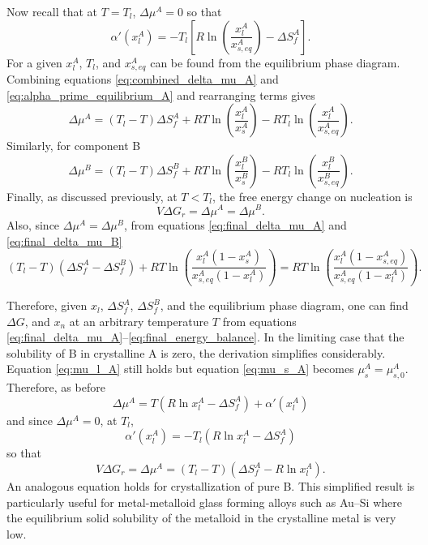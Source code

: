 Now recall that at \(T = T_l\), \(\Delta \mu^A = 0\) so that
\begin{equation}
\alpha'(x_l^A) = -T_l \left[ R \ln\left(\frac{x_l^A}{x_{s,eq}^A}\right) - \Delta S_f^A \right]. \label{eq:alpha_prime_equilibrium_A}
\end{equation}
For a given \(x_l^A\), \(T_l\), and \(x_{s,eq}^A\) can be found from the equilibrium phase diagram. Combining equations \eqref{eq:combined_delta_mu_A} and \eqref{eq:alpha_prime_equilibrium_A} and rearranging terms gives
\begin{equation}
\Delta \mu^A = (T_l - T) \Delta S_f^A + RT \ln\left(\frac{x_l^A}{x_{s}^A}\right) - RT_l \ln\left(\frac{x_l^A}{x_{s,eq}^A}\right). \label{eq:final_delta_mu_A}
\end{equation}
Similarly, for component B
\begin{equation}
\Delta \mu^B = (T_l - T) \Delta S_f^B + RT \ln\left(\frac{x_l^B}{x_{s}^B}\right) - RT_l \ln\left(\frac{x_l^B}{x_{s,eq}^B}\right). \label{eq:final_delta_mu_B}
\end{equation}
Finally, as discussed previously, at \(T < T_l\), the free energy change on nucleation is
\begin{equation}
V \Delta G_r = \Delta \mu^A = \Delta \mu^B. \label{eq:free_energy_change_nucleation}
\end{equation}
Also, since \(\Delta \mu^A = \Delta \mu^B\), from equations \eqref{eq:final_delta_mu_A} and \eqref{eq:final_delta_mu_B}
\begin{equation}
(T_l - T)(\Delta S_f^A - \Delta S_f^B) + RT \ln\left(\frac{x_l^A(1 - x_{s}^A)}{x_{s,eq}^A(1 - x_l^A)}\right) = RT \ln\left(\frac{x_l^A(1 - x_{s,eq}^A)}{x_{s,eq}^A(1 - x_l^A)}\right). \label{eq:final_energy_balance}
\end{equation}

Therefore, given \(x_l\), \(\Delta S_f^A\), \(\Delta S_f^B\), and the equilibrium phase diagram, one can find \(\Delta G\), and \(x_n\) at an arbitrary temperature \(T\) from equations \eqref{eq:final_delta_mu_A}--\eqref{eq:final_energy_balance}. In the limiting case that the solubility of B in crystalline A is zero, the derivation simplifies considerably. Equation \eqref{eq:mu_l_A} still holds but equation \eqref{eq:mu_s_A} becomes \(\mu_s^A = \mu_{s,0}^A\). Therefore, as before
\begin{equation}
\Delta \mu^A = T(R \ln x_l^A - \Delta S_f^A) + \alpha'(x_l^A) \label{eq:simplified_delta_mu_A}
\end{equation}
and since \(\Delta \mu^A = 0\), at \(T_l\),
\begin{equation}
\alpha'(x_l^A) = -T_l(R \ln x_l^A - \Delta S_f^A) \label{eq:simplified_alpha_prime_A}
\end{equation}
so that
\begin{equation}
V \Delta G_r = \Delta \mu^A = (T_l - T)(\Delta S_f^A - R \ln x_l^A). \label{eq:simplified_free_energy_change}
\end{equation}
An analogous equation holds for crystallization of pure B. This simplified result is particularly useful for metal-metalloid glass forming alloys such as Au–Si where the equilibrium solid solubility of the metalloid in the crystalline metal is very low.

